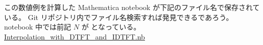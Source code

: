             この数値例を計算した Mathematica notebook が下記のファイル名で保存されている。
            Git リポジトリ内でファイル名検索すれば発見できるであろう。
            notebook 中では前記 $N$ が  となっている。\newline
            \href{\currfiledir/calc/Interpolation_with_DTFT_and_IDTFT/Interpolation_with_DTFT_and_IDTFT.nb}{Interpolation\_with\_DTFT\_and\_IDTFT.nb}\newline
